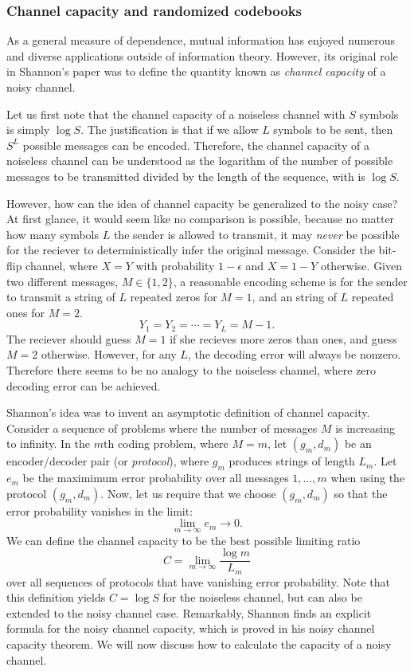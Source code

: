 \subsubsection{Channel capacity and randomized codebooks}

As a general measure of dependence, mutual information has enjoyed
numerous and diverse applications outside of information theory.
However, its original role in Shannon's paper was to define the
quantity known as \emph{channel capacity} of a noisy channel.

Let us first note that the channel capacity of a noiseless channel
with $S$ symbols is simply $\log S$.  The justification is that if we
allow $L$ symbols to be sent, then $S^L$ possible messages can be
encoded.  Therefore, the channel capacity of a noiseless channel can
be understood as the logarithm of the number of possible messages to
be transmitted divided by the length of the sequence, with is $\log
S$.

However, how can the idea of channel capacity be generalized to the
noisy case?  At first glance, it would seem like no comparison is
possible, because no matter how many symbols $L$ the sender is allowed
to transmit, it may \emph{never} be possible for the reciever to
deterministically infer the original message.  Consider the bit-flip
channel, where $X = Y$ with probability $1-\epsilon$ and $X = 1-Y$
otherwise.  Given two different messages, $M \in \{1,2\}$, a
reasonable encoding scheme is for the sender to transmit a string of
$L$ repeated zeros for $M = 1$, and an string of $L$ repeated ones for
$M = 2$.
\[
Y_1 = Y_2 = \cdots = Y_L = M-1.
\]
The reciever should guess $M = 1$ if she recieves more zeros than
ones, and guess $M = 2$ otherwise.  However, for any $L$, the decoding
error will always be nonzero.  Therefore there seems to be no analogy
to the noiseless channel, where zero decoding error can be achieved.

Shannon's idea was to invent an asymptotic definition of channel
capacity.  Consider a sequence of problems where the number of
messages $M$ is increasing to infinity.  In the $m$th coding problem,
where $M = m$, let $(g_m, d_m)$ be an encoder/decoder pair (or \emph{protocol}), where
$g_m$ produces strings of length $L_m$.  Let $e_m$ be the maximimum
error probability over all messages $1,\hdots, m$ when using the
protocol $(g_m, d_m)$.  Now, let us require that we choose $(g_m,
d_m)$ so that the error probability vanishes in the limit:
\[
\lim_{m \to \infty} e_m \to 0.
\]
We can define the channel capacity to be the best possible limiting ratio
\[
C = \lim_{m \to \infty} \frac{\log m}{L_m}
\]
over all sequences of protocols that have vanishing error probability.
Note that this definition yields $C = \log S$ for the noiseless
channel, but can also be extended to the noisy channel case.
Remarkably, Shannon finds an explicit formula for the noisy channel
capacity, which is proved in his noisy channel capacity theorem.  We
will now discuss how to calculate the capacity of a noisy channel.

